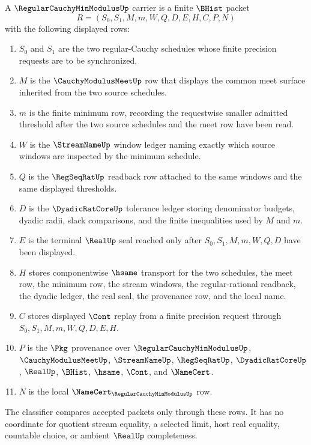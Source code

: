 \begin{definition}\label{def:regular-cauchy-min-modulus-carrier}
A $\RegularCauchyMinModulusUp$ carrier is a finite $\BHist$ packet
$$
R=(S_0,S_1,M,m,W,Q,D,E,H,C,P,N)
$$
with the following displayed rows:
\begin{enumerate}
\item $S_0$ and $S_1$ are the two regular-Cauchy schedules whose finite precision requests are to be synchronized.
\item $M$ is the $\CauchyModulusMeetUp$ row that displays the common meet surface inherited from the two source schedules.
\item $m$ is the finite minimum row, recording the requestwise smaller admitted threshold after the two source schedules and the meet row have been read.
\item $W$ is the $\StreamNameUp$ window ledger naming exactly which source windows are inspected by the minimum schedule.
\item $Q$ is the $\RegSeqRatUp$ readback row attached to the same windows and the same displayed thresholds.
\item $D$ is the $\DyadicRatCoreUp$ tolerance ledger storing denominator budgets, dyadic radii, slack comparisons, and the finite inequalities used by $M$ and $m$.
\item $E$ is the terminal $\RealUp$ seal reached only after $S_0,S_1,M,m,W,Q,D$ have been displayed.
\item $H$ stores componentwise $\hsame$ transport for the two schedules, the meet row, the minimum row, the stream windows, the regular-rational readback, the dyadic ledger, the real seal, the provenance row, and the local name.
\item $C$ stores displayed $\Cont$ replay from a finite precision request through $S_0,S_1,M,m,W,Q,D,E,H$.
\item $P$ is the $\Pkg$ provenance over $\RegularCauchyMinModulusUp$, $\CauchyModulusMeetUp$, $\StreamNameUp$, $\RegSeqRatUp$, $\DyadicRatCoreUp$, $\RealUp$, $\BHist$, $\hsame$, $\Cont$, and $\NameCert$.
\item $N$ is the local $\NameCert_{\RegularCauchyMinModulusUp}$ row.
\end{enumerate}
The classifier compares accepted packets only through these rows. It has no coordinate for quotient stream equality, a selected limit, host real equality, countable choice, or ambient $\RealUp$ completeness.
\end{definition}

